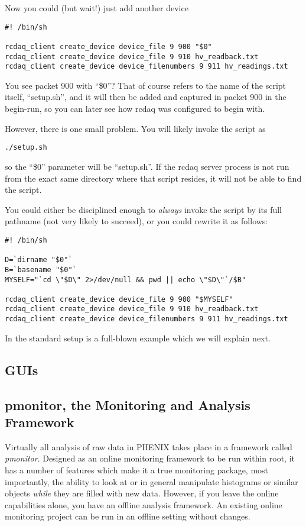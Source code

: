 \documentclass{article}[11pt]
\begin{document}
Now you could (but wait!) just add another device

\begin{verbatim} 
#! /bin/sh

rcdaq_client create_device device_file 9 900 "$0" 
rcdaq_client create_device device_file 9 910 hv_readback.txt 
rcdaq_client create_device device_filenumbers 9 911 hv_readings.txt
\end{verbatim}

You see packet 900 with ``\$0''? That of course refers to the name of
the script itself, ``setup.sh'', and it will then be added and
captured in packet 900 in the begin-run, so you can later see how
rcdaq was configured to begin with.

However, there is one small problem. You will likely invoke the script as 
\begin{verbatim} 
./setup.sh
\end{verbatim}
so the ``\$0'' parameter will be ``setup.sh''. If the rcdaq server
process is not run from the exact same directory where that script
resides, it will not be able to find the script.

You could either be disciplined enough to \emph{always} invoke the
script by its full pathname (not very likely to succeed), or you could
rewrite it as follows:


\begin{verbatim} 
#! /bin/sh

D=`dirname "$0"`
B=`basename "$0"`
MYSELF="`cd \"$D\" 2>/dev/null && pwd || echo \"$D\"`/$B"

rcdaq_client create_device device_file 9 900 "$MYSELF"
rcdaq_client create_device device_file 9 910 hv_readback.txt 
rcdaq_client create_device device_filenumbers 9 911 hv_readings.txt
\end{verbatim}


In the standard setup is a full-blown example which we will explain
next.


\subsection{GUIs}

\subsection{pmonitor, the Monitoring and Analysis Framework}

Virtually all analysis of raw data in PHENIX takes place in a
framework called \emph{pmonitor}. Designed as an online monitoring
framework to be run within root, it has a number of features which
make it a true monitoring package, most importantly, the ability to
look at or in general manipulate histograms or similar objects
\emph{while} they are filled with new data. However, if you leave the
online capabilities alone, you have an offline analysis framework. An
existing online monitoring project can be run in an offline setting
without changes.
\end{document}
